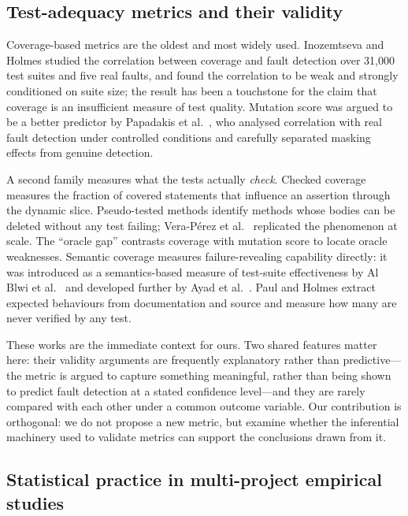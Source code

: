 \documentclass[preprint,12pt]{elsarticle}
\begin{document}
\subsection{Test-adequacy metrics and their validity}

Coverage-based metrics are the oldest and most widely used. Inozemtseva and
Holmes \cite{inozemtseva2014coverage} studied the correlation between
coverage and fault detection over 31{,}000 test suites and five real faults,
and found the correlation to be weak and strongly conditioned on suite size;
the result has been a touchstone for the claim that coverage is an
insufficient measure of test quality. Mutation score was argued to be a
better predictor by Papadakis et al.\ \cite{papadakis2018mutation}, who
analysed correlation with real fault detection under controlled conditions
and carefully separated masking effects from genuine detection.

A second family measures what the tests actually \emph{check}. Checked
coverage \cite{schuler2011checked} measures the fraction of covered
statements that influence an assertion through the dynamic slice.
Pseudo-tested methods \cite{niedermayr2016pseudo} identify methods whose
bodies can be deleted without any test failing; Vera-P{\'e}rez et al.\
\cite{vera2019comprehensive} replicated the phenomenon at scale. The
``oracle gap'' \cite{jain2023mindthegap} contrasts coverage with mutation
score to locate oracle weaknesses. Semantic coverage measures
failure-revealing capability directly: it was introduced as a
semantics-based measure of test-suite effectiveness by Al Blwi et al.\
\cite{alblwi2023semantic} and developed further by Ayad et al.\
\cite{ayad2025detecting}. Paul and Holmes \cite{paul2026beyond} extract
expected behaviours from documentation and source and measure how many are
never verified by any test.

These works are the immediate context for ours. Two shared features matter
here: their validity arguments are frequently explanatory rather than
predictive---the metric is argued to capture something meaningful, rather
than being shown to predict fault detection at a stated confidence
level---and they are rarely compared with each other under a common
outcome variable. Our contribution is orthogonal: we do not propose a new
metric, but examine whether the inferential machinery used to validate
metrics can support the conclusions drawn from it.

\subsection{Statistical practice in multi-project empirical studies}
\end{document}
